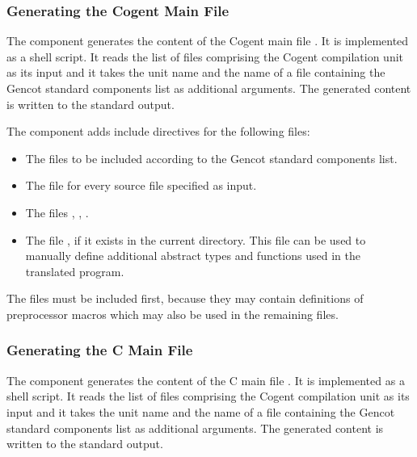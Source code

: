 \subsubsection{Generating the Cogent Main File}

The component  generates the content of the Cogent main file . 
It is implemented as a shell script. It reads the list of
 files comprising the Cogent compilation unit as its input and it takes the unit name 
and the name of a file containing the Gencot standard components list as additional arguments. The generated content 
is written to the standard output. 

The component adds include directives for the following files:
\begin{itemize}
\item The files to be included according to the Gencot standard components list.
\item The file  for every source file  specified as input.
\item The files , , .
\item The file , if it exists in the current directory. This file can be used to
manually define additional abstract types and functions used in the translated program.
\end{itemize}

The files  must be included first, because they may contain definitions of preprocessor macros
which may also be used in the remaining files.

\subsubsection{Generating the C Main File}

The component  generates the content of the C main file . 
It is implemented as a shell script. It reads the list of
 files comprising the Cogent compilation unit as its input and it takes the unit name 
and the name of a file containing the Gencot standard components list as additional arguments. The generated content 
is written to the standard output. 

